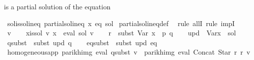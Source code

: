 \begin{isabellebody}
{\isafoldproof}%
%
\isadelimproof
%
\endisadelimproof
%
\begin{isamarkuptext}%
 is a partial solution of the equation%
\end{isamarkuptext}\isamarkuptrue%
\isamarkupfalse%
\ sol{\isacharunderscore}{\kern0pt}is{\isacharunderscore}{\kern0pt}sol{\isacharunderscore}{\kern0pt}ineq{\isacharcolon}{\kern0pt}\ {\isachardoublequoteopen}partial{\isacharunderscore}{\kern0pt}sol{\isacharunderscore}{\kern0pt}ineq\ x\ eq\ sol{\isachardoublequoteclose}\isanewline
%
\isadelimproof
%
\endisadelimproof
%
\isatagproof
{}\isamarkupfalse%
\ partial{\isacharunderscore}{\kern0pt}sol{\isacharunderscore}{\kern0pt}ineq{\isacharunderscore}{\kern0pt}def\ \isamarkupfalse%
\ {\isacharparenleft}{\kern0pt}rule\ allI{\isacharcomma}{\kern0pt}\ rule\ impI{\isacharparenright}{\kern0pt}\isanewline
\ \ \isamarkupfalse%
\ v\isanewline
\ \ \isamarkupfalse%
\ x{\isacharunderscore}{\kern0pt}is{\isacharunderscore}{\kern0pt}sol{\isacharcolon}{\kern0pt}\ {\isachardoublequoteopen}v\ x\ {\isacharequal}{\kern0pt}\ eval\ sol\ v{\isachardoublequoteclose}\isanewline
\isanewline
\ \ \isamarkupfalse%
\ {\isacharquery}{\kern0pt}r\ {\isacharequal}{\kern0pt}\ {\isachardoublequoteopen}subst\ {\isacharparenleft}{\kern0pt}Var\ {\isacharparenleft}{\kern0pt}x\ {\isacharcolon}{\kern0pt}{\isacharequal}{\kern0pt}\ p{\isacharparenright}{\kern0pt}{\isacharparenright}{\kern0pt}\ q{\isachardoublequoteclose}\isanewline
\ \ \isamarkupfalse%
\ {\isacharquery}{\kern0pt}upd\ {\isacharequal}{\kern0pt}\ {\isachardoublequoteopen}Var{\isacharparenleft}{\kern0pt}x\ {\isacharcolon}{\kern0pt}{\isacharequal}{\kern0pt}\ sol{\isacharparenright}{\kern0pt}{\isachardoublequoteclose}\isanewline
\ \ \isamarkupfalse%
\ {\isacharquery}{\kern0pt}q{\isacharunderscore}{\kern0pt}subst\ {\isacharequal}{\kern0pt}\ {\isachardoublequoteopen}subst\ {\isacharquery}{\kern0pt}upd\ q{\isachardoublequoteclose}\isanewline
\ \ \isamarkupfalse%
\ {\isacharquery}{\kern0pt}eq{\isacharunderscore}{\kern0pt}subst\ {\isacharequal}{\kern0pt}\ {\isachardoublequoteopen}subst\ {\isacharquery}{\kern0pt}upd\ eq{\isachardoublequoteclose}\isanewline
\isanewline
\ \ \isamarkupfalse%
\ homogeneous{\isacharunderscore}{\kern0pt}app{\isacharcolon}{\kern0pt}\ {\isachardoublequoteopen}parikh{\isacharunderscore}{\kern0pt}img\ {\isacharparenleft}{\kern0pt}eval\ {\isacharquery}{\kern0pt}q{\isacharunderscore}{\kern0pt}subst\ v{\isacharparenright}{\kern0pt}\ {\isasymsubseteq}\ parikh{\isacharunderscore}{\kern0pt}img\ {\isacharparenleft}{\kern0pt}eval\ {\isacharparenleft}{\kern0pt}Concat\ {\isacharparenleft}{\kern0pt}Star\ {\isacharquery}{\kern0pt}r{\isacharparenright}{\kern0pt}\ {\isacharquery}{\kern0pt}r{\isacharparenright}{\kern0pt}\ v{\isacharparenright}{\kern0pt}{\isachardoublequoteclose}\isanewline

\end{isabellebody}
